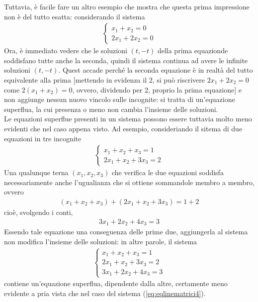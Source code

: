 \begin{defi}
  Tuttavia, è facile fare un altro esempio che mostra che questa prima
  impressione non è del tutto esatta: considerando il sistema
  \begin{eqnarray}
    \label{eq:eqlinematrici4}
    \begin{cases}
      x_1+x_2=0 \\
      2x_1+2x_2=0
    \end{cases}
  \end{eqnarray}
  Ora, è immediato vedere che le soluzioni $(t,-t)$ della prima equazionde
  soddisfano tutte anche la seconda, quindi il sistema continua ad avere
  le infinite soluzioni $(t,-t)$. Quest accade perché la seconda equazione
  è in realtà del tutto equivalente alla prima [mettendo in evidenza il
  2, si può riscrivere $2x_1+2x_2=0$ come $2(x_1+x_2)=0$, ovvero,
  dividendo per 2, proprio la prima equazione] e non aggiunge nessun
  nuovo vincolo sulle incognite: si tratta di un'equazione superflua, la
  cui presenza o meno non cambia l'insieme delle soluzioni.\\
  Le equazioni superflue presenti in un sistema possono essere tuttavia
  molto meno evidenti che nel caso appena visto. Ad esempio, consideriando
  il sitema di due equazioni in tre incognite
  \begin{eqnarray}
    \label{eq:eqlinematrici5}
    \begin{cases}
      x_1+x_2+x_3=1\\
      2x_1+x_2+3x_3=2
    \end{cases}
  \end{eqnarray}
  Una qualunque terna $(x_1,x_2,x_3)$ che verifica le due equazioni
  soddisfa necessariamente anche l'ugualianza che si ottiene sommandole
  membro a membro, ovvero
  \begin{eqnarray*}
    (x_1+x_2+x_3) + (2x_1+x_2+3x_3) = 1+2
  \end{eqnarray*}
  cioè, svolgendo i conti,
  \begin{eqnarray*}
    3x_1+2x_2+4x_3=3
  \end{eqnarray*}
  Essendo tale equazione una conseguenza delle prime due, aggiungerla al
  sistema non modifica l'insieme delle soluzioni: in altre parole, il
  sistema
  \begin{eqnarray}
    \label{eq:eqlinematrici6}
    \begin{cases}
      x_1+x_2+x_3=1\\
      2x_1+x_2+3x_3=2\\
      3x_1+2x_2+4x_3=3
    \end{cases}
  \end{eqnarray}
  contiene un'equazione superflua, dipendente dalla altre, certamente meno
  evidente a pria vista che nel caso del sistema
  (\ref{eq:eqlinematrici4}).


\end{defi}
